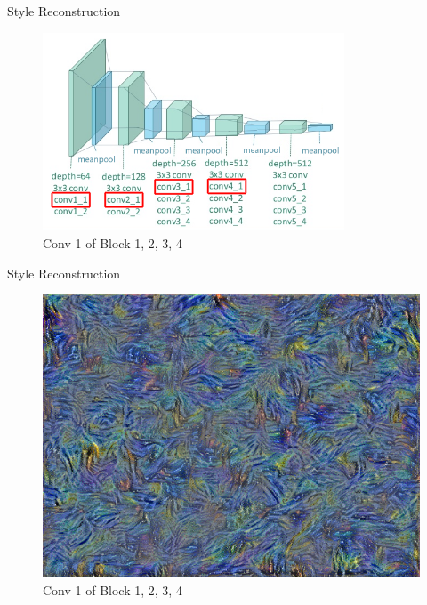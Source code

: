\documentclass{beamer}
\begin{document}
\begin{frame}{Style Reconstruction}
\begin{figure}[ht]
\centering
\includegraphics[width=0.8\textwidth]{img/vgg19/style/block4_conv1}
\caption*{Conv 1 of Block 1, 2, 3, 4}
\end{figure}
\end{frame}
\begin{frame}{Style Reconstruction}
\begin{figure}[ht]
\centering
\includegraphics[width=.8\textwidth]{img/style/block4_conv1}
\caption*{Conv 1 of Block 1, 2, 3, 4}
\end{figure}
\end{frame}
\end{document}
